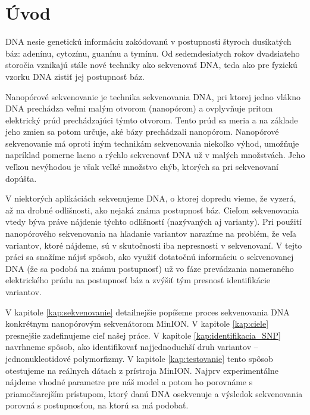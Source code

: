 \chapter*{Úvod} %

DNA nesie genetickú informáciu zakódovanú v postupnosti štyroch
dusíkatých báz: adenínu, cytozínu, guanínu a tymínu.
Od sedemdesiatych rokov dvadsiateho storočia vznikajú stále nové
techniky ako sekvenovať DNA, teda ako pre fyzickú vzorku DNA zistiť
jej postupnosť báz.

Nanopórové sekvenovanie je technika sekvenovania DNA, pri ktorej jedno vlákno
DNA prechádza veľmi malým otvorom (nanopórom) a ovplyvňuje pritom elektrický
prúd prechádzajúci týmto otvorom. Tento prúd sa meria a na základe jeho
zmien sa potom určuje, aké bázy prechádzali nanopórom. Nanopórové sekvenovanie
má oproti iným technikám sekvenovania niekoľko výhod,
umožňuje napríklad pomerne lacno a rýchlo sekvenovať DNA už v malých množstvách.
Jeho veľkou nevýhodou je však veľké množstvo chýb, ktorých sa pri sekvenovaní dopúšťa.

V niektorých aplikáciách sekvenujeme DNA, o ktorej dopredu vieme, že vyzerá, až na 
drobné odlišnosti, ako nejaká známa postupnosť báz.
Cieľom sekvenovania vtedy býva práve nájdenie týchto odlišností (nazývaných aj varianty). Pri použití
nanopórového sekvenovania na hľadanie variantov narazíme na problém, že veľa
variantov, ktoré nájdeme, sú v skutočnosti iba nepresnosti v sekvenovaní. V tejto
práci sa snažíme nájsť spôsob, ako využiť dotatočnú informáciu o sekvenovanej DNA
(že sa podobá na známu postupnosť) už vo fáze prevádzania nameraného elektrického
prúdu na postupnosť báz a zvýšiť tým presnosť identifikácie variantov.

V kapitole \ref{kap:sekvenovanie} detailnejšie popíšeme proces sekvenovania DNA konkrétnym 
nanopórovým sekvenátorom MinION. V kapitole \ref{kap:ciele} presnejšie zadefinujeme cieľ našej
práce.
V kapitole \ref{kap:identifikacia_SNP} navrhneme spôsob, ako identifikovať najjednoduchší
druh variantov -- jednonukleotidové polymorfizmy.
V kapitole \ref{kap:testovanie} tento spôsob otestujeme na reálnych dátach z prístroja MinION.
 Najprv experimentálne nájdeme vhodné parametre pre náš model a potom
ho porovnáme s priamočiarejším prístupom, ktorý danú DNA osekvenuje a výsledok sekvenovania porovná
s postupnosťou, na ktorú sa má podobať.